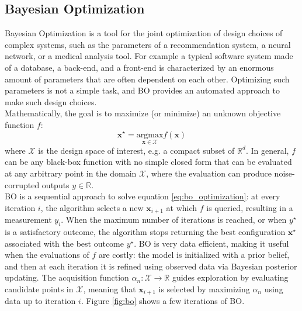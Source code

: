 \documentclass[a4paper, 12pt]{article} %
\begin{document}
	\subsection{ Bayesian Optimization } \label{ssec:bayesian_optimization}
	Bayesian Optimization \cite{BO} is a tool for the joint optimization of design choices of complex systems, such as the parameters of a recommendation system, a neural network, or a medical analysis tool. For example a typical software system made of a database, a back-end, and a front-end is characterized by an enormous amount of parameters that are often dependent on each other.
	Optimizing such parameters is not a simple task, and BO provides an automated approach to make such design choices.\\
	
	Mathematically, the goal is to maximize (or minimize) an unknown objective function $f$:\\
	\begin{equation} \label{eq:bo_optimization}
				\pmb{x}^\star = \underset{\pmb{x} \in \mathcal{X}}{\mathrm{argmax}} f(\pmb{x})
	\end{equation}
	where $\mathcal{X}$ is the design space of interest, e.g. a compact subset of $\mathbb{R}^d$. In general, $f$ can be any black-box function with no simple closed form that can be evaluated at any arbitrary point in the domain $\mathcal{X}$, where the evaluation can produce noise-corrupted outputs $y \in \mathbb{R}$.\\
	BO is a sequential approach to solve equation \ref{eq:bo_optimization}: at every iteration $i$, the algorithm selects a new $\pmb{x}_{i+1}$ at which $f$ is queried, resulting in a measurement $y_i$. When the maximum number of iterations is reached, or when $y^\star$ is a satisfactory outcome, the algorithm stops returning the best configuration $\pmb{x}^\star$ associated with the best outcome $y^\star$. BO is very data efficient, making it useful when the evaluations of $f$ are costly: the model is initialized with a prior belief, and then at each iteration it is refined using observed data via Bayesian posterior updating. The acquisition function $\alpha_n : \mathcal{X} \rightarrow \mathbb{R}$ guides exploration by evaluating candidate points in $\mathcal{X}$, meaning that $\pmb{x}_{i+1}$ is selected by maximizing $\alpha_n$ using data up to iteration $i$. Figure \ref{fig:bo} shows a few iterations of BO.
\end{document}
